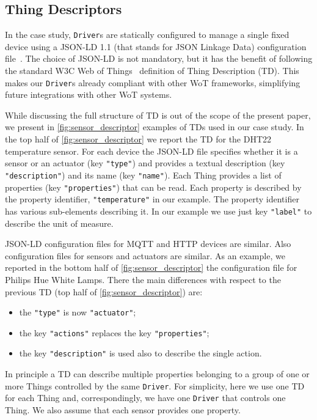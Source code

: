 \subsection{Thing Descriptors}

In the case study, \texttt{Driver}s are statically configured to manage a
single fixed device using a JSON-LD 1.1 (that stands for JSON Linkage Data)
configuration file~\cite{jsonld}. The choice of JSON-LD is not mandatory, but
it has the benefit of following the standard W3C Web of Things~\cite{w3c17}
definition of Thing Description (TD). This makes our \texttt{Driver}s already
compliant with other WoT frameworks, simplifying future integrations with
other WoT systems.

While discussing the full structure of TD is out of the scope of the present
paper, we present in \cref{fig:sensor_descriptor} examples of TDs used in our
case study. In the top half of \cref{fig:sensor_descriptor} we report the TD
for the DHT22 temperature sensor. For each device the JSON-LD file
specifies whether it is a sensor or an actuator (key \lstinline|"type"|) and
provides a textual description (key \lstinline|"description"|) and its name
(key \lstinline|"name"|). Each Thing provides a list of
properties (key \lstinline|"properties"|) that can be read. Each property is
described by the property identifier, \lstinline{"temperature"} in our
example. The property identifier has various sub-elements describing it. In
our example we use just key \lstinline{"label"} to describe the unit of
measure.

JSON-LD configuration files for MQTT and HTTP devices are similar. Also
configuration files for sensors and actuators are similar. As an example, we
reported in the bottom half of \cref{fig:sensor_descriptor} the configuration
file for Philips Hue White Lamps. There the main differences with respect to
the previous TD (top half of \cref{fig:sensor_descriptor}) are:
\begin{itemize}
  \item the \lstinline{"type"} is now {\small\color{color:comment}\texttt{"actuator"}};
  \item the key \lstinline{"actions"} replaces the key \lstinline{"properties"};
  \item the key \lstinline{"description"} is used also to describe the single action.
\end{itemize}

In principle a TD can describe multiple properties belonging to a
group of one or more Things controlled by the same
\texttt{Driver}. For simplicity, here we use one TD for each Thing
and, correspondingly, we have one \texttt{Driver} that controls one
Thing. We also assume that each sensor provides one property.

